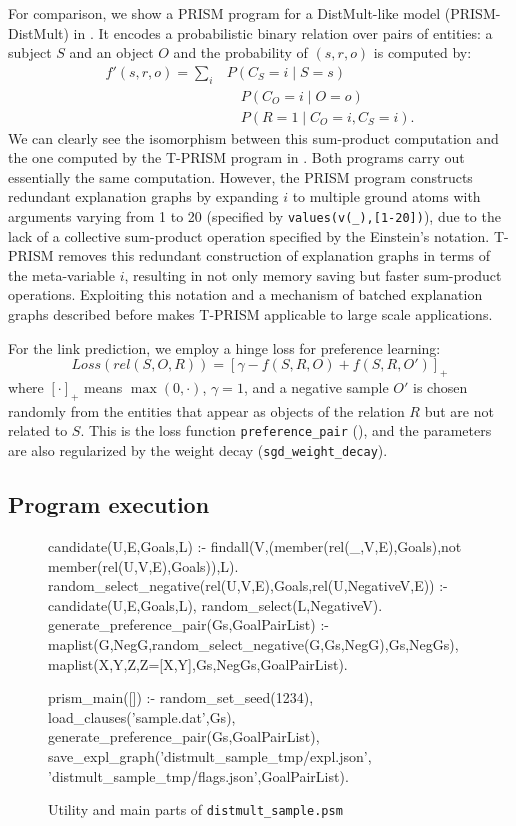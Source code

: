\documentclass[a4paper]{report}
\begin{document}
For  comparison, we  show  a PRISM  program  for a DistMult-like  model
(PRISM-DistMult)
in  \cite{kojima2018ijar}.  It encodes a
probabilistic binary  relation over pairs  of entities: a  subject $S$
and an object $O$ and the probability of $(s,r,o)$ is computed by:
\begin{align}\nonumber
f'(s,r,o)=\sum_i & P(C_S=i \mid S=s) \\ \nonumber
&\hspace{1em} P(C_O=i \mid O=o) \\
&\hspace{1em} P(R=1 \mid C_O=i, C_S=i).
\label{eq:prism-distmult}
\end{align}
%
We can clearly see the isomorphism between this sum-product computation and the
one computed by the T-PRISM program in
.
Both programs carry out essentially the same computation. However, the
PRISM program constructs redundant explanation graphs by expanding $i$
to  multiple  ground  atoms  with  arguments  varying  from  1  to  20
(specified  by  {\tt values(v(\_),[1-20])}),  due  to  the lack  of  a
collective sum-product operation specified by the Einstein's notation.
T-PRISM removes  this redundant construction of  explanation graphs in
terms of  the meta-variable $i$,  resulting in not only  memory saving
but  faster sum-product  operations.  Exploiting  this notation  and a
mechanism of batched explanation graphs described before makes T-PRISM
applicable to large scale applications.

For the link prediction, we employ a hinge loss for preference learning:
%
\[Loss(rel(S,O,R)) = \left[ \gamma - f(S, R, O) + f(S, R, O') \right]_{+}\]
%
where $[\cdot]_{+}$ means $\max(0,\cdot)$, $\gamma=1$, and a negative
sample $O'$ is chosen randomly from the entities that appear as objects of
the relation $R$ but are not related to $S$.  This is the loss function
{\tt preference\_pair} (), and the parameters
are also regularized by the weight decay ({\tt sgd\_weight\_decay}).

\subsection*{Program execution}
\begin{figure}[tb]
\begin{prologcode}[numbers=left]
candidate(U,E,Goals,L) :-
    findall(V,(member(rel(_,V,E),Goals),not member(rel(U,V,E),Goals)),L).
random_select_negative(rel(U,V,E),Goals,rel(U,NegativeV,E)) :-
    candidate(U,E,Goals,L),
    random_select(L,NegativeV).
generate_preference_pair(Gs,GoalPairList) :-
    maplist(G,NegG,random_select_negative(G,Gs,NegG),Gs,NegGs),
    maplist(X,Y,Z,Z=[X,Y],Gs,NegGs,GoalPairList).

prism_main([]) :-
    random_set_seed(1234),
    load_clauses('sample.dat',Gs),
    generate_preference_pair(Gs,GoalPairList),
    save_expl_graph('distmult_sample_tmp/expl.json',
                    'distmult_sample_tmp/flags.json',GoalPairList).
\end{prologcode}
\caption{Utility and main parts of {\tt distmult\_sample.psm}}
\label{fig:distmult-main}
\end{figure}
\end{document}
